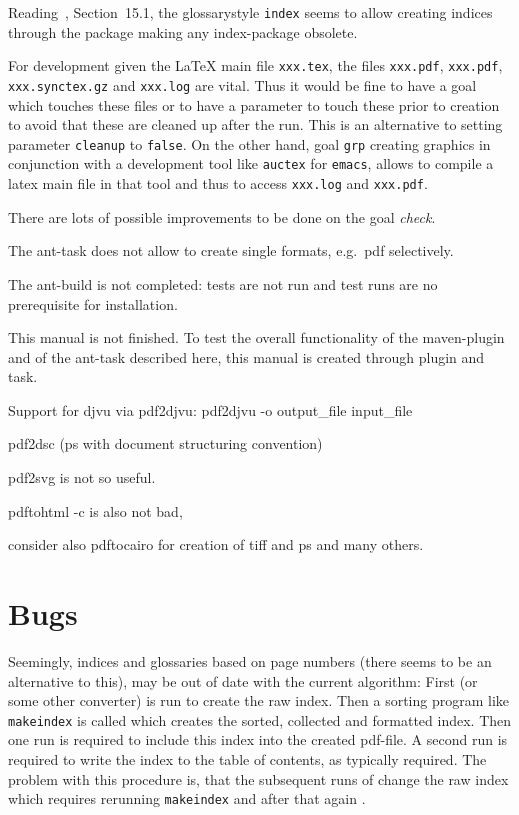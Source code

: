 \documentclass[12pt]{book}
\begin{document}
Reading~\cite{GloP}, Section~15.1, the glossarystyle \texttt{index} 
seems to allow creating indices through the  package 
making any index-package obsolete. 

For development given the \LaTeX{} main file \texttt{xxx.tex}, 
the files \texttt{xxx.pdf}, \texttt{xxx.pdf}, \texttt{xxx.synctex.gz} 
and \texttt{xxx.log} are vital. 
Thus it would be fine to have a goal which touches these files 
or to have a parameter to touch these prior to creation 
to avoid that these are cleaned up after the run. 
This is an alternative to setting parameter \texttt{cleanup} to \texttt{false}. 
On the other hand, goal \texttt{grp} creating graphics 
in conjunction with a development tool like \texttt{auctex} for \texttt{emacs}, 
allows to compile a latex main file in that tool 
and thus to access \texttt{xxx.log} and \texttt{xxx.pdf}. 

There are lots of possible improvements to be done on the goal \emph{check}. 


The ant-task does not allow to create single formats, e.g.~pdf selectively. 

The ant-build is not completed: tests are not run and 
test runs are no prerequisite for installation. 

This manual is not finished. 
To test the overall functionality of the maven-plugin and of the ant-task 
described here, this manual is created through plugin and task. 

Support for djvu via pdf2djvu: 
pdf2djvu -o output\_file input\_file

pdf2dsc
(ps with document structuring convention) 

pdf2svg is not so useful. 

pdftohtml -c is also not bad, 

consider also pdftocairo for creation of tiff and ps and many others. 

\chapter{Bugs}\label{chap:bugs}

Seemingly, indices and glossaries based on page numbers 
(there seems to be an alternative to this), 
may be out of date with the current algorithm: 
First \lualatex{} (or some other converter) is run to create the raw index. 
Then a sorting program like \texttt{makeindex} is called 
which creates the sorted, collected and formatted index. 
Then one \lualatex{} run is required to include this index 
into the created pdf-file. 
A second \lualatex{} run is required 
to write the index to the table of contents, as typically required. 
The problem with this procedure is, 
that the subsequent runs of \lualatex{} change the raw index 
which requires rerunning \texttt{makeindex} 
and after that again \lualatex. 
\end{document}
